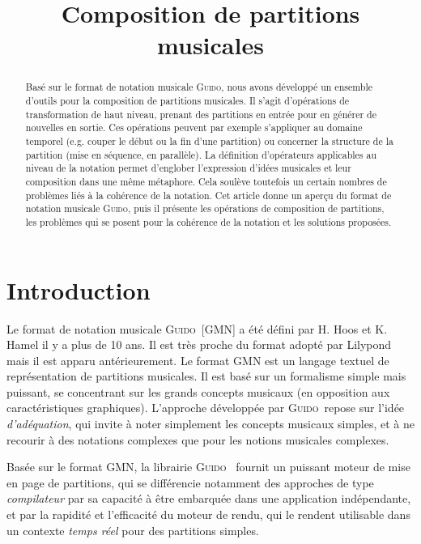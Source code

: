 \documentclass{article}
\title{Composition de partitions musicales}
\newcommand{\Guido}		{\textsc{Guido}}
\begin{document}
%
\maketitle
%
\begin{abstract}
Basé sur le format de notation musicale \Guido , nous avons développé un ensemble d'outils pour la composition de partitions musicales. Il s'agit d'opérations de transformation de haut niveau, prenant des partitions en entrée pour en générer de nouvelles  en sortie. Ces opérations peuvent par exemple s'appliquer au domaine temporel (e.g. couper le début ou la fin d'une partition) ou concerner la structure de la partition (mise en séquence, en parallèle).
La définition d'opérateurs applicables au niveau de la notation permet d'englober l'expression d'idées musicales et leur composition dans une même métaphore. Cela soulève toutefois un certain nombres de problèmes liés à la cohérence de la notation.
Cet article donne un aperçu du format de notation musicale \Guido , puis il présente les opérations de composition de partitions, les problèmes qui se posent pour la cohérence de la notation et les solutions proposées.
\end{abstract}

\section{Introduction}\label{sec:intro}
Le format de notation musicale \Guido\ [GMN] \cite{hoos98} \cite{guido} a été défini par H. Hoos et K. Hamel il y a plus de 10 ans.
Il est très proche du format adopté par Lilypond \cite{lilypond03} \cite{lilypond06} mais il est apparu antérieurement.
Le format GMN est un langage textuel de représentation de partitions musicales. Il est basé sur un formalisme simple mais puissant, se concentrant sur les grands concepts musicaux (en opposition aux caractéristiques graphiques). L'approche développée par \Guido\ repose sur l'idée \emph{d'adéquation}, qui invite à noter simplement les concepts musicaux simples, et à ne recourir à des notations complexes que pour les notions musicales complexes.

Basée sur le format GMN, la librairie \Guido\ \cite{daudin09a,Fober:04b} fournit un puissant moteur de mise en page de partitions, qui se différencie notamment des approches de type \emph{compilateur}  \cite{lilypond03,musixtex} par sa capacité à être embarquée dans une application indépendante, et par la rapidité et l'efficacité du moteur de rendu, qui le rendent utilisable dans un contexte \emph{temps réel} pour des partitions simples.
\end{document}
